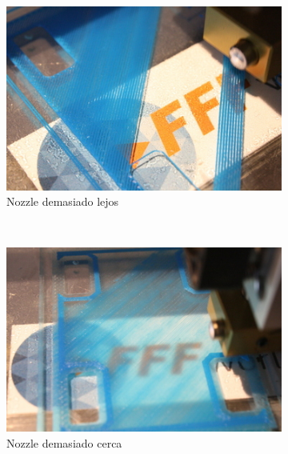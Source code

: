 \documentclass[11pt,a4paper]{article}
\begin{document}
\begin{figure}[H]
    \centering
    \begin{subfigure}[b]{0.3\textwidth}
        \includegraphics[width=\textwidth,cfbox=azul_marcos 3pt 0pt]{FOTOS/HOTENDALTO}
	\caption*{Nozzle demasiado lejos}
    \end{subfigure}
    ~ %
    \begin{subfigure}[b]{0.3\textwidth}
        \includegraphics[width=\textwidth,cfbox=azul_marcos 3pt 0pt]{FOTOS/HOTENDBAJO}
	\caption*{Nozzle demasiado cerca}
    \end{subfigure}
    ~ %
    \begin{subfigure}[b]{0.3\textwidth}

\end{subfigure}
\end{figure}
\end{document}
